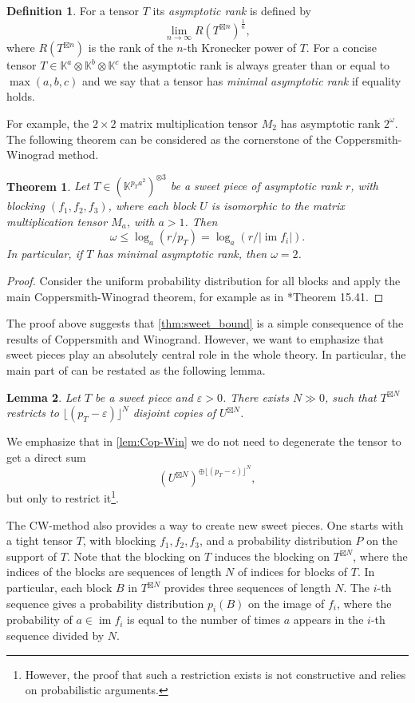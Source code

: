 \documentclass[a4paper,11pt,reqno]{amsart}
\newcommand{\bbK}{\mathbb{K}}
\DeclareMathOperator{\im}{im}
\newcommand{\oldtext}[1]{\textcolor{darkelectricblue}{#1}}
\newcommand{\cfchange}[1]{\textcolor{blue}{#1}}
\numberwithin{equation}{section}
\theoremstyle{definition}
\newtheorem{defn}[equation]{Definition}
\theoremstyle{plain}
\newtheorem{teo}[defn]{Theorem}
\newtheorem{lem}[defn]{Lemma}
\theoremstyle{remark}
\begin{document}
\begin{defn}
For a tensor $T$ its \emph{asymptotic rank} is defined by \[
\lim_{n\rightarrow\infty} R(T^{\boxtimes n})^{\frac{1}{n}},
\]
where $R(T^{\boxtimes n})$ is the rank of the $n$-th Kronecker power of $T$.
For a concise tensor $T\in \bbK^a\otimes \bbK^b\otimes \bbK^c$ the asymptotic rank is always greater than or equal to $\max(a,b,c)$ and we say that a tensor has \emph{minimal asymptotic rank} if equality holds.
\end{defn}
For example, the $2\times 2$ matrix multiplication tensor $M_2$ has asymptotic rank $2^{\omega}$.
The following theorem can be considered as the cornerstone of the Coppersmith-Winograd method.
\begin{teo}\label{thm:sweet_bound}
    Let $T\in (\bbK^{p_Ta^2})^{\otimes 3}$ be a sweet piece of
asymptotic rank $r$, with blocking $(f_1,f_2,f_3)$,  where each block $U$ is isomorphic to the matrix multiplication tensor $M_a$, with $a>1$. Then
\[\omega \leq \log_a (r/p_T)= \log_a (r/|\im f_i|).\]
In particular, if $T$ has minimal
 asymptotic rank, then $\omega=2$.
\end{teo}
\begin{proof}
Consider the uniform probability distribution for all blocks and apply the main Coppersmith-Winograd theorem, for example as in \cite{BCS97}*{Theorem 15.41}.
\end{proof}
The proof above suggests that \autoref{thm:sweet_bound} is a simple consequence of the results of Coppersmith and Winogrand. However, we want to emphasize  that sweet pieces play an absolutely central role in the whole theory. In particular, the main part of \cite{CW} can be restated as the following lemma.
\begin{lem}
\label{lem:Cop-Win}
Let $T$ be a sweet piece and $\varepsilon >0$. There exists $N\gg 0$, such that $T^{\boxtimes N}$ restricts to $\lfloor(p_T-\varepsilon)\rfloor^N$ disjoint copies of $U^{\boxtimes N}$.
\end{lem}
We emphasize that in \autoref{lem:Cop-Win} we do not need to degenerate the tensor to get a direct sum \[(U^{\boxtimes N})^{\oplus \lfloor(p_T-\varepsilon)\rfloor^N},\] but only to restrict it\footnote{However, the proof that such a restriction exists is not constructive and relies on probabilistic arguments.}.

The CW-method also provides a way to create new sweet pieces. One starts with a tight tensor $T$, with blocking $f_1,f_2,f_3$, and a probability distribution $P$ on the support of $T$. Note that the blocking on $T$ induces the blocking on $T^{\boxtimes N}$, where the indices of the blocks are sequences of length $N$ of indices for blocks of $T$. In particular, each block $B$ in $T^{\boxtimes N}$ provides three sequences of length $N$. The $i$-th sequence gives a probability distribution $p_i(B)$ on the image of $f_i$, where the probability of $a\in \im f_i$ is equal to the number of times $a$ appears in the $i$-th sequence divided by $N$.
\end{document}
